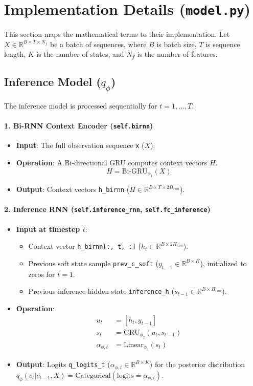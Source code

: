 \documentclass[11pt, a4paper]{article}
\begin{document}
\section{Implementation Details (\texttt{model.py})}
This section maps the mathematical terms to their implementation. Let $X \in \mathbb{R}^{B \times T \times N_f}$ be a batch of sequences, where $B$ is batch size, $T$ is sequence length, $K$ is the number of states, and $N_f$ is the number of features.

\subsection{Inference Model ($q_{\phi}$)}
The inference model is processed sequentially for $t=1, \dots, T$.

\paragraph{1. Bi-RNN Context Encoder (\texttt{self.birnn})}
\begin{itemize}
    \item \textbf{Input}: The full observation sequence \texttt{x} ($X$).
    \item \textbf{Operation}: A Bi-directional GRU computes context vectors $H$.
        \[ H = \text{Bi-GRU}_{\phi_1}(X) \]
    \item \textbf{Output}: Context vectors \texttt{h\_birnn} ($H \in \mathbb{R}^{B \times T \times 2H_{rnn}}$).
\end{itemize}

\paragraph{2. Inference RNN (\texttt{self.inference\_rnn}, \texttt{self.fc\_inference})}
\begin{itemize}
    \item \textbf{Input at timestep $t$}:
    \begin{itemize}
        \item Context vector \texttt{h\_birnn[:, t, :]} ($h_t \in \mathbb{R}^{B \times 2H_{rnn}}$).
        \item Previous soft state sample \texttt{prev\_c\_soft} ($y_{t-1} \in \mathbb{R}^{B \times K}$), initialized to zeros for $t=1$.
        \item Previous inference hidden state \texttt{inference\_h} ($s_{t-1} \in \mathbb{R}^{B \times H_{rnn}}$).
    \end{itemize}
    \item \textbf{Operation}:
    \begin{align*}
        u_t &= [h_t, y_{t-1}] \\
        s_t &= \text{GRU}_{\phi_2}(u_t, s_{t-1}) \\
        \alpha_{\phi, t} &= \text{Linear}_{\phi_3}(s_t)
    \end{align*}
    \item \textbf{Output}: Logits \texttt{q\_logits\_t} ($\alpha_{\phi, t} \in \mathbb{R}^{B \times K}$) for the posterior distribution $q_{\phi}(c_t | c_{t-1}, X) = \text{Categorical}(\text{logits}=\alpha_{\phi, t})$.
\end{itemize}
\end{document}

